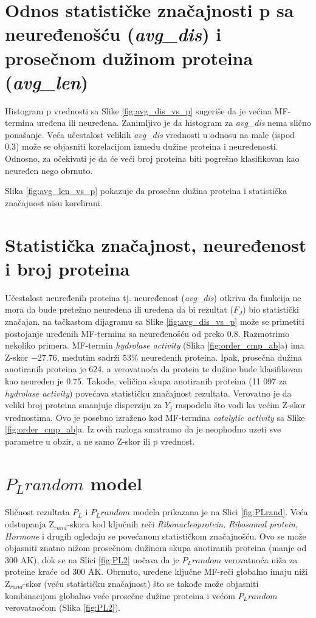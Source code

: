 \section{Odnos statističke značajnosti p sa neuređenošću (\textit{avg\_dis}) i prosečnom dužinom proteina (\textit{avg\_len}) }

Histogram p vrednosti sa Slike \ref{fig:avg_dis_vs_p} sugeriše da je većina
MF-termina uređena ili neuređena. Zanimljivo je da histogram za
\textit{avg\_dis} nema slično ponašanje. Veća učestalost velikih
\textit{avg\_dis} vrednosti u odnosu na male (ispod 0.3) može se objasniti
korelacijom između dužine proteina i neuređenosti. Odnosno, za očekivati je da
će veći broj proteina biti pogrešno klasifikovan kao neuređen nego obrnuto.

Slika \ref{fig:avg_len_vs_p} pokazuje da prosečna dužina proteina 
i statistička značajnost nisu korelirani. 


\section{Statistička značajnost, neuređenost i broj proteina}

Učestalost neuređenih proteina tj. neuređenost  (\textit{avg\_dis}) otkriva da
funkcija ne mora da bude pretežno neuređena ili uređena da bi rezultat ($F_J$)
bio statistički značajan. na tačkastom dijagramu sa
Slike \ref{fig:avg_dis_vs_p} može se primetiti postojanje uređenih
MF-termina sa neuređenošću od preko 0.8.  Razmotrimo nekoliko primera.
MF-termin \textit{hydrolase activity} (Slika \ref{fig:order_cmp_ab}a) ima
Z-skor $-27.76$, međutim sadrži $53\%$ neuređenih proteina. Ipak, prosečna
dužina anotiranih proteina je 624, a verovatnoća da protein te dužine bude
klasifikovan kao neuređen je 0.75.  Takođe, veličina skupa anotiranih proteina
(11 097 za \textit{hydrolase activity}) povećava statističku značajnost
rezultata. Verovatno je da veliki broj proteina smanjuje disperziju za $Y_j$
raspodelu što vodi ka većim Z-skor vrednostima.  Ovo je posebno izraženo kod
MF-termina \textit{catalytic activity} sa Slike \ref{fig:order_cmp_ab}a.  Iz
ovih razloga smatramo da je neophodno uzeti sve parametre u obzir, a ne samo
Z-skor ili p vrednost.

\section{$P_Lrandom$ model}

Sličnost rezultata $P_L$ i $P_L random$ modela prikazana je na Slici
\ref{fig:PLrand}. Veća odstupanja Z$_{rand}$-skora kod ključnih reči
\textit{Ribonucleoprotein, Ribosomal protein, Hormone} i drugih ogledaju se
povećanom statističkom značajnošću. Ovo se može objasniti znatno
nižom prosečnom dužinom skupa anotiranih proteina (manje od 300 AK), dok se na
Slici \ref{fig:PL2} uočava da je $P_L random$ verovatnoća niža za proteine
kraće od 300 AK.  Obrnuto, uređene ključne MF-reči  globalno imaju niži
Z$_{rand}$-skor (veću statističku značajnost) što se takođe može objasniti
kombinacijom globalno veće prosečne dužine proteina i većom $P_L random$
verovatnoćom (Slika \ref{fig:PL2}). 

